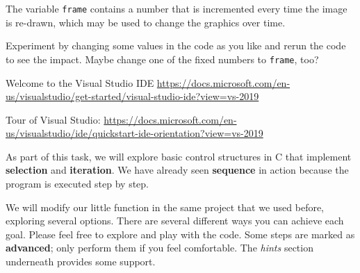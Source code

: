 \begin{steps}
  The variable \texttt{frame} contains a number that is incremented every time the image is re-drawn, which may be used to change the graphics over time.
  \item Experiment by changing some values in the code as you like and rerun the code to see the impact.
  Maybe change one of the fixed numbers to \texttt{frame}, too?
\end{steps}

\begin{literature}
\item Welcome to the Visual Studio IDE
\url{https://docs.microsoft.com/en-us/visualstudio/get-started/visual-studio-ide?view=vs-2019}
\item Tour of Visual Studio: \url{https://docs.microsoft.com/en-us/visualstudio/ide/quickstart-ide-orientation?view=vs-2019}
\end{literature}



As part of this task, we will explore basic control structures in C that implement  \textbf{selection} and \textbf{iteration}.
We have already seen \textbf{sequence} in action because the program is executed step by step.

We will modify our little  function in the same project that we used before, exploring several options.
There are several different ways you can achieve each goal. Please feel free to explore and play with the code.
Some steps are marked as \textbf{advanced}; only perform them if you feel comfortable.
The \textit{hints} section underneath provides some support.

